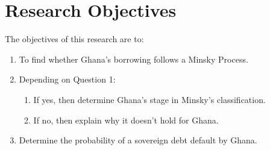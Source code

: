 \documentclass[a4paper, 12pt]{article}
\begin{document}
	
	\section{Research Objectives}
	The objectives of this research are to:
	
	\begin{enumerate}
		\item To find whether Ghana's borrowing follows a Minsky Process.
		\item  Depending on Question 1:
		\begin{enumerate}
			\item If yes, then determine Ghana's stage in Minsky's classification.
			\item If no, then explain why it doesn't hold for Ghana.
		\end{enumerate}
		
		\item Determine the probability of a sovereign debt default by Ghana.
	\end{enumerate}
\end{document}
